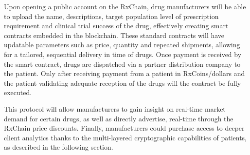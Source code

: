 
Upon opening a public account on the RxChain, drug manufacturers will be able to upload the name, descriptions, target population level of prescription requirement and clinical trial success of the drug, effectively creating smart contracts embedded in the blockchain. These standard contracts will have updatable parameters such as price, quantity and repeated shipments, allowing for a tailored, sequential delivery in time of drugs. Once payment is received by the smart contract, drugs are dispatched via a partner distribution company to the patient. Only after receiving payment from a patient in RxCoins/dollars and the patient validating adequate reception of the drugs will the contract be fully executed.

This protocol will allow manufacturers to gain insight on real-time market demand for certain drugs, as well as directly advertise, real-time through the RxChain price discounts. 
Finally, manufacturers could purchase access to deeper client analytics thanks to the multi-layered cryptographic capabilities of patients, as described in the following section.
